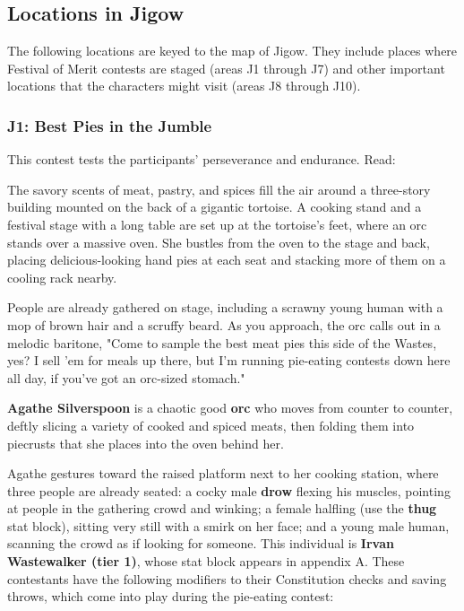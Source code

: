 \documentclass[10pt,a4paper,twoside,bg=print,twocolumn,openany,nodeprecatedcode]{dndbook}
\begin{document}
\subsection{Locations in Jigow}
The following locations are keyed to the map of Jigow. They include places where Festival of Merit contests are staged (areas J1 through J7) and other important locations that the characters might visit (areas J8 through J10).

\subsubsection{J1: Best Pies in the Jumble}
This contest tests the participants' perseverance and endurance. Read:

\begin{DndReadAloud}{}
The savory scents of meat, pastry, and spices fill the air around a three-story building mounted on the back of a gigantic tortoise. A cooking stand and a festival stage with a long table are set up at the tortoise's feet, where an orc stands over a massive oven. She bustles from the oven to the stage and back, placing delicious-looking hand pies at each seat and stacking more of them on a cooling rack nearby.

People are already gathered on stage, including a scrawny young human with a mop of brown hair and a scruffy beard. As you approach, the orc calls out in a melodic baritone, "Come to sample the best meat pies this side of the Wastes, yes? I sell 'em for meals up there, but I'm running pie-eating contests down here all day, if you've got an orc-sized stomach."

\end{DndReadAloud}

\textbf{Agathe Silverspoon} is a chaotic good \textbf{orc} who moves from counter to counter, deftly slicing a variety of cooked and spiced meats, then folding them into piecrusts that she places into the oven behind her.

Agathe gestures toward the raised platform next to her cooking station, where three people are already seated: a cocky male \textbf{drow} flexing his muscles, pointing at people in the gathering crowd and winking; a female halfling (use the \textbf{thug} stat block), sitting very still with a smirk on her face; and a young male human, scanning the crowd as if looking for someone. This individual is \textbf{Irvan Wastewalker (tier 1)}, whose stat block appears in appendix A. These contestants have the following modifiers to their Constitution checks and saving throws, which come into play during the pie-eating contest:
\end{document}
